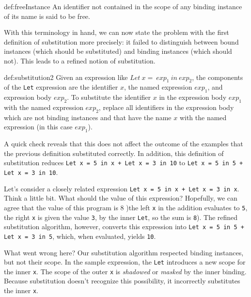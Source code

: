 \documentclass{book}
\renewcommand{\emph}[1]{{\color{blue}\textit{#1}}}
\begin{document}
\begin{mydef}{def:freeInstance}
An identifier not contained in the scope of any 
binding instance of its name is said to be 
free. 
\end{mydef}

With this terminology in hand, we can now state 
the problem with the first definition of 
substitution more precisely: it failed to distinguish 
between bound instances (which should be substituted) 
and binding instances (which should not). This leads 
to a refined notion of substitution. 

\begin{mydef}{def:substitution2}
Given an expression like $Let\ x =\ exp_1\ in\ exp_2$,
the components of the \texttt{Let} expression are the 
identifier \texttt{$x$}, the named expression \texttt{$exp_1$}, 
and expression body \texttt{$exp_2$}. To substitute 
the identifier \texttt{$x$} in the expression body \texttt{$exp_1$} 
with the named expression \texttt{$exp_2$}, replace all identifiers 
in the expression body which are not binding instances and 
that have the name \texttt{$x$} with the 
named expression (in this case \texttt{$exp_1$}). 
\end{mydef}

A quick check reveals that this does not affect the 
outcome of the examples that the previous definition 
substituted correctly. In addition, this definition of 
substitution reduces 
\texttt{Let x = 5 in x + Let x = 3 in 10} to 
\texttt{Let x = 5 in 5 + Let x = 3 in 10}. 

Let's consider a closely related expression 
\texttt{Let x = 5 in x + Let x = 3 in x}. Think 
a little bit. What should the value of this 
expression? Hopefully, we can agree that the 
value of this program is 8 )the left \texttt{x} in the 
addition evaluates to \texttt{5}, the right 
\texttt{x} is given the value \texttt{3}, by the inner 
\texttt{Let}, so the sum is \texttt{8}). The refined substitution 
algorithm, however, converts this expression into 
\texttt{Let x = 5 in 5 + Let x = 3 in 5}, which, 
when evaluated, yields \texttt{10}. 

What went wrong here? Our substitution algorithm 
respected binding instances, but not their 
scope. In the sample expression, the \texttt{Let} introduces 
a new scope for the inner \texttt{x}. The scope of the 
outer \texttt{x} is \emph{shadowed} or \emph{masked} 
by the inner binding. Because substitution doesn't 
recognize this possibility, it incorrectly substitutes 
the inner \texttt{x}. 
\end{document}
